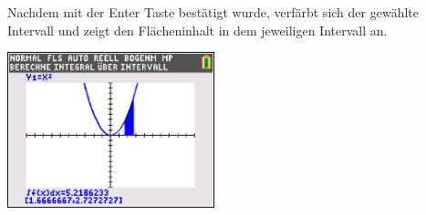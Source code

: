 \begin{paracol}{2}
\begin{flushleft}
	Nachdem mit der Enter Taste bestätigt wurde, verfärbt sich der gewählte Intervall und zeigt den Flächeninhalt in dem jeweiligen Intervall an. 
\end{flushleft}
\switchcolumn
\begin{flushright}
	\includegraphics[width=6cm]{Media/GRT/Visualisierung/Integrale_berechnen/Integrale_berechnen_4.png}
\end{flushright}
\end{paracol}




